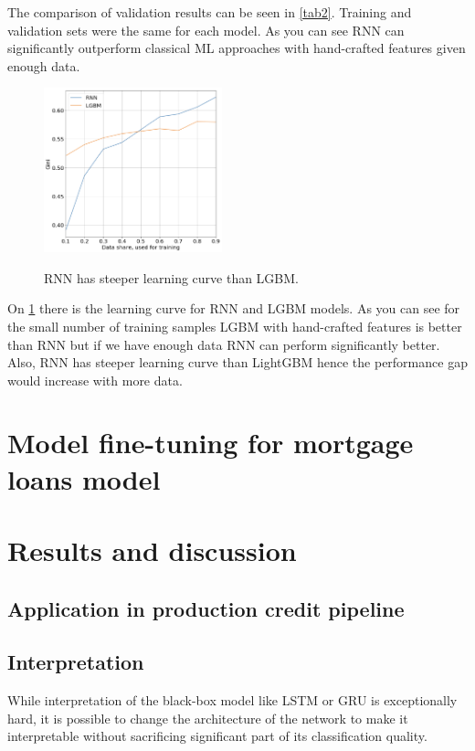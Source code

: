 \documentclass{sigkddExp}
\begin{document}
The comparison of validation results can be seen in \ref{tab2}. Training and validation sets were the same for each model.  As you can see RNN can significantly outperform classical ML approaches with hand-crafted features given enough data.

\begin{figure}
  \caption{RNN has steeper learning curve than LGBM.}
  \includegraphics[width=0.46\textwidth]{learning-curve.png}
  \label{fig1}
\end{figure}

On \ref{fig1} there is the learning curve for RNN and LGBM models. As you can see for the small number of training samples LGBM with hand-crafted features is better than RNN but if we have enough data RNN can perform significantly better. Also, RNN has steeper learning curve than LightGBM hence the performance gap would increase with more data.

\section{Model fine-tuning for mortgage loans model}

\section{Results and discussion}

\subsection{Application in production credit pipeline}

\subsection{Interpretation}

While interpretation of the black-box model like LSTM or GRU is exceptionally hard, it is possible to change the architecture of the network to make it interpretable without sacrificing significant part of its classification quality.
\end{document}
